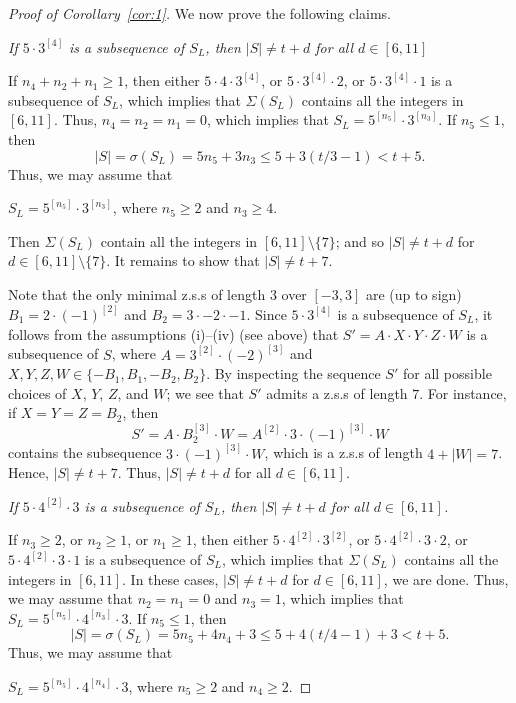 \documentclass[12 pt]{amsart}
\def \n{\noindent }
\def \bs{\bigskip}
\def \zs{z.s.s }
\begin{document}
\begin{proof}[Proof of Corollary~\ref{cor:1}]
We now prove the following claims.

\bs\n {\bf Claim~1:} {\em  If $5\cdot 3^{[4]}$ is a subsequence of $S_L$, then  $|S|\not=t+d$ for all $d\in[6,11]$}

If $n_4+n_2+n_1\geq1$, then either $5\cdot 4\cdot 3^{[4]}$, or  $5\cdot 3^{[4]}\cdot 2$, or $5\cdot 3^{[4]}\cdot 1$ is a subsequence of $S_L$, which implies that $\Sigma(S_L)$ contains all the integers in $[6,11]$. Thus, ${n_4}={n_2}={n_1}=0$, which implies that $S_L=5^{[n_5]}\cdot 3^{[n_3]}$. If $n_5\leq 1$, then 
\[|S|=\sigma(S_L)=5n_5+3n_3\leq 5+3(t/3-1)<t+5.\]
Thus, we may assume that  
 
\centerline{$S_L=5^{[n_5]}\cdot 3^{[n_3]}$, where $n_5\geq 2$ and ${n_3}\geq 4$.}

Then $\Sigma(S_L)$ contain all the integers in $[6,11]\setminus\{7\}$; and so $|S|\not=t+d$ for $d\in[6,11]\setminus\{7\}$. It remains to show that $|S|\not=t+7$.

Note that the only minimal \zs of length $3$ over
$[-3,3]$ are (up to sign) $B_1=2\cdot(-1)^{[2]}$ and $B_2=3\cdot-2\cdot-1$. Since $5\cdot 3^{[4]}$ is a subsequence of $S_L$, it follows from the assumptions (i)--(iv) (see above) that 
$S'=A\cdot X\cdot Y\cdot Z\cdot W$ is a subsequence of $S$, where  $A=3^{[2]}\cdot(-2)^{[3]}$ and $X,Y,Z,W\in\{-B_1,B_1,-B_2,B_2\}$. By inspecting the sequence $S'$ for all possible choices of $X$, $Y$, $Z$, and $W$; we see that $S'$ admits a \zs of length $7$. For instance, if $X=Y=Z=B_2$, then 
\[S'=A\cdot B_2^{[3]}\cdot W=A^{[2]}\cdot 3\cdot(-1)^{[3]}\cdot W\]
contains the subsequence $3\cdot(-1)^{[3]}\cdot W$, which is a \zs of length $4+|W|=7$. Hence, $|S|\not=t+7$.
 Thus, $|S|\not=t+d$ for all $d\in[6,11]$.
 
\bs\n {\bf Claim~2:} {\em If $5\cdot 4^{[2]}\cdot 3$ is a subsequence of $S_L$, then  $|S|\not=t+d$ for all $d\in[6,11]$.}

If $n_3\geq2$, or $n_2\geq 1$, or $n_1\geq1$, then either $5\cdot 4^{[2]}\cdot 3^{[2]}$, or $5\cdot 4^{[2]}\cdot 3\cdot 2$, or  $5\cdot 4^{[2]}\cdot 3\cdot 1$ is a subsequence of $S_L$, which implies that $\Sigma(S_L)$ contains 
all the integers in $[6,11]$. In these cases, $|S|\not=t+d$ for $d\in[6,11]$, we are done. Thus, we may assume that $n_2=n_1=0$
and $n_3=1$, which implies that $S_L=5^{[n_5]}\cdot 4^{[n_3]}\cdot3$. 
If $n_5\leq1$, then 
\[|S|=\sigma(S_L)=5n_5+4n_4+3\leq 5+4(t/4-1)+3<t+5.\] 
Thus, we may assume that  

\centerline{$S_L=5^{[n_5]}\cdot 4^{[n_4]}\cdot 3$, where $n_5\geq 2$ and ${n_4}\geq 2$.}


\end{proof}
\end{document}
